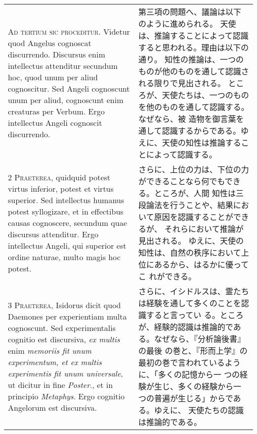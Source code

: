 \documentclass[10pt]{jsarticle} %
\begin{document}
\begin{longtable}{p{21em}p{21em}}



{\Huge A}{\scshape d tertium sic proceditur}. Videtur quod
 Angelus cognoscat discurrendo. Discursus enim intellectus attenditur
 secundum hoc, quod unum per aliud cognoscitur. Sed Angeli cognoscunt
 unum per aliud, cognoscunt enim creaturas per Verbum. Ergo intellectus
 Angeli cognoscit discurrendo.


&

第三項の問題へ、議論は以下のように進められる。
天使は、推論することによって認識すると思われる。理由は以下の通り。
知性の推論は、一つのものが他のものを通して認識される限りで見出される。
ところが、天使たちは、一つのものを他のものを通して認識する。なぜなら、被
 造物を御言葉を通して認識するからである。ゆえに、天使の知性は推論するこ
 とによって認識する。


\\



{\scshape 2 Praeterea}, quidquid potest virtus inferior,
 potest et virtus superior. Sed intellectus humanus potest syllogizare,
 et in effectibus causas cognoscere, secundum quae discursus
 attenditur. Ergo intellectus Angeli, qui superior est ordine naturae,
 multo magis hoc potest.


&

さらに、上位の力は、下位の力ができることなら何でもできる。ところが、人間
 知性は三段論法を行うことや、結果において原因を認識することができるが、
 それらにおいて推論が見出される。
ゆえに、天使の知性は、自然の秩序において上位にあるから、はるかに優ってこ
 れができる。


\\



{\scshape 3 Praeterea}, Isidorus dicit quod Daemones per
 experientiam multa cognoscunt. Sed experimentalis cognitio est
 discursiva, {\itshape ex multis} enim {\itshape memoriis fit unum experimentum, et  ex multis
 experimentis fit unum universale}, ut dicitur in fine {\itshape Poster}., et in
 principio {\itshape Metaphys}. Ergo cognitio Angelorum est discursiva.


&

さらに、イシドルスは、霊たちは経験を通して多くのことを認識すると言ってい
 る。ところが、経験的認識は推論的である。なぜなら、『分析論後書』の最後
 の巻と、『形而上学』の最初の巻で言われているように、「多くの記憶から一
 つの経験が生じ、多くの経験から一つの普遍が生じる」からである。ゆえに、
 天使たちの認識は推論的である。



\end{longtable}
\end{document}
